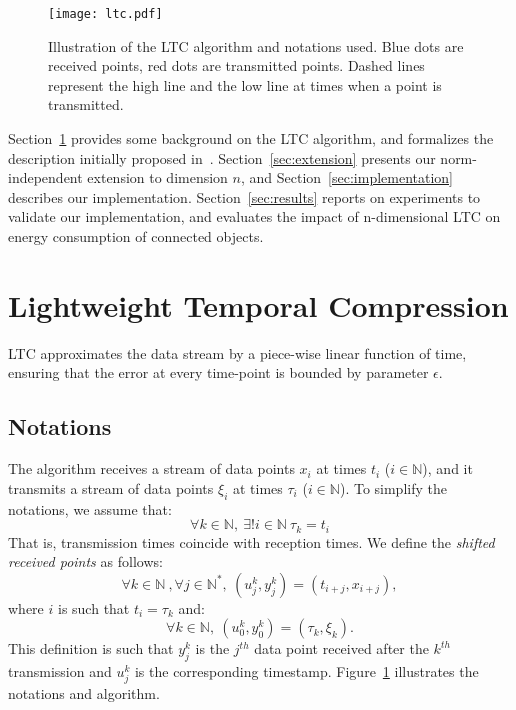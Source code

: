 \documentclass[10pt, conference, compsocconf]{IEEEtran}
\newcommand{\todo}[1]{\marginpar{\parbox{18mm}{\flushleft\tiny\color{red}\textbf{TODO}:
      #1}}}
\begin{document}
\begin{figure}
\texttt{[image: ltc.pdf]}
\caption{Illustration of the LTC algorithm and notations used. Blue 
dots are received points, red dots are transmitted points. Dashed lines 
represent the high line and the low line at times when a point is 
transmitted.\vspace*{-0.3cm}}
\label{fig:ltc}
\end{figure}
\todo{show $\xi$ in the Figure}

Section~\ref{sec:ltc} provides some background on the LTC algorithm, 
and formalizes the description initially proposed 
in~\cite{schoellhammer2004lightweight}. Section~\ref{sec:extension} 
presents our norm-independent extension to dimension $n$, and 
Section~\ref{sec:implementation} describes our implementation. 
Section~\ref{sec:results} reports on experiments to validate our 
implementation, and evaluates the impact of n-dimensional LTC on 
energy consumption of connected objects.


\section{Lightweight Temporal Compression}
\label{sec:ltc}

LTC approximates the data stream
by a piece-wise linear function of time, ensuring that the error at
every time-point is bounded by parameter $\epsilon$.

\subsection{Notations}

The algorithm receives a stream of data points $x_i$
at times $t_i$ ($i \in \mathbb{N}$), and it transmits a stream of data points $\xi_i$
at times $\tau_i$ ($i \in \mathbb{N}$). To simplify the notations, we assume that:
\begin{equation*}
\forall k \in \mathbb{N}, \  \exists ! i \in \mathbb{N} \  \tau_k = t_i
\end{equation*}
That is, transmission times coincide with reception times.
We define the \emph{shifted received points} as follows:
\begin{equation*}
\forall k \in \mathbb{N}\ , \forall j \in \mathbb{N^*},\ (u^k_j, y^k_j) = (t_{i+j}, x_{i+j}), 
\end{equation*}
where $i$ is such that $t_i = \tau_k$ and:
\begin{equation*}
\forall k \in \mathbb{N},\  (u^k_0, y^k_0) = (\tau_k, \xi_k).
\end{equation*}
This definition is such that $y^k_j$ is the $j^{th}$ data point received
after the $k^{th}$ transmission and $u^k_j$ is the corresponding timestamp.
Figure~\ref{fig:ltc} illustrates the notations and algorithm.
\end{document}
